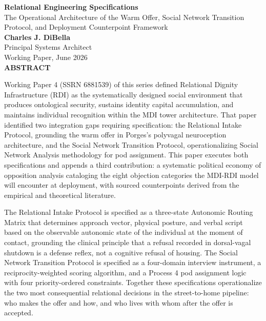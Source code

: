 \documentclass[12pt, letterpaper]{article}
\begin{document}
\captionsetup[table]{labelfont=normalfont, labelsep=period, skip=6pt}

\begin{titlepage}
\begin{center}
{\LARGE \textbf{Relational Engineering Specifications}}\\[6pt]
{\large The Operational Architecture of the Warm Offer, Social Network Transition Protocol, and Deployment Counterpoint Framework}\\[0.5cm]
{\normalsize \textbf{Charles J. DiBella}}\\[0.01cm]
{\normalsize Principal Systems Architect}\\[0.01cm]
{\normalsize Working Paper, June 2026}\\[0.3cm]
\textbf{ABSTRACT}
\vspace{0.2cm}
\end{center}
\begin{minipage}{0.95\textwidth}
\noindent

Working Paper 4 (SSRN 6881539) of this series defined Relational Dignity Infrastructure (RDI) as the systematically designed social environment that produces ontological security, sustains identity capital accumulation, and maintains individual recognition within the MDI tower architecture. That paper identified two integration gaps requiring specification: the Relational Intake Protocol, grounding the warm offer in Porges's polyvagal neuroception architecture, and the Social Network Transition Protocol, operationalizing Social Network Analysis methodology for pod assignment. This paper executes both specifications and appends a third contribution: a systematic political economy of opposition analysis cataloging the eight objection categories the MDI-RDI model will encounter at deployment, with sourced counterpoints derived from the empirical and theoretical literature.

\vspace{0.2cm}
The Relational Intake Protocol is specified as a three-state Autonomic Routing Matrix that determines approach vector, physical posture, and verbal script based on the observable autonomic state of the individual at the moment of contact, grounding the clinical principle that a refusal recorded in dorsal-vagal shutdown is a defense reflex, not a cognitive refusal of housing. The Social Network Transition Protocol is specified as a four-domain interview instrument, a reciprocity-weighted scoring algorithm, and a Process 4 pod assignment logic with four priority-ordered constraints. Together these specifications operationalize the two most consequential relational decisions in the street-to-home pipeline: who makes the offer and how, and who lives with whom after the offer is accepted.


\end{minipage}
\end{titlepage}
\end{document}
